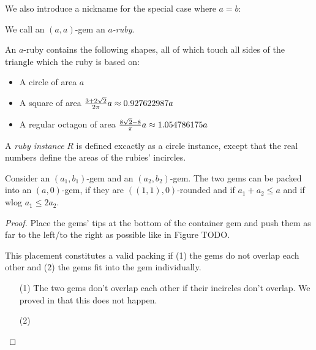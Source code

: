 \documentclass[a4paper,style=print,bibliography=totoc,nexus,lnum,extramargin]{tubsbook}
\begin{document}

We also introduce a nickname for the special case where $a=b$:

\begin{definition}
    We call an $(a,a)$-gem an \emph{$a$-ruby}.
\end{definition}


An $a$-ruby contains the following shapes, all of which touch all sides of the triangle which the ruby is based on:

\begin{itemize}
    \item A circle of area $a$
    \item A square of area $\frac{3+2\sqrt{2}}{2\pi}a \approx 0.927622987a$
    \item A regular octagon of area $\frac{8\sqrt{2}-8}{\pi}a \approx 1.054786175a$
\end{itemize}

\begin{definition}
    A \emph{ruby instance} $R$ is defined excactly as a circle instance, except that the real numbers define the areas of the rubies' incircles.
\end{definition}

\begin{theorem}
    Consider an $(a_1, b_1)$-gem and an $(a_2, b_2)$-gem. The two gems can be packed into an $(a,0)$-gem, if they are $((1,1),0)$-rounded and if $a_1 + a_2 \le a$ and if wlog $a_1 \le 2 a_2$.
\end{theorem}

\begin{proof}
    Place the gems' tips at the bottom of the container gem and push them as far to the left/to the right as possible like in Figure TODO.

    This placement constitutes a valid packing if (1) the gems do not overlap each other and (2) the gems fit into the gem individually.

    \begin{itemize}
        \item[(1)]
            The two gems don't overlap each other if their incircles don't overlap. We proved in  that this does not happen.
        \item[(2)]

    \end{itemize}
\end{proof}
\end{document}
